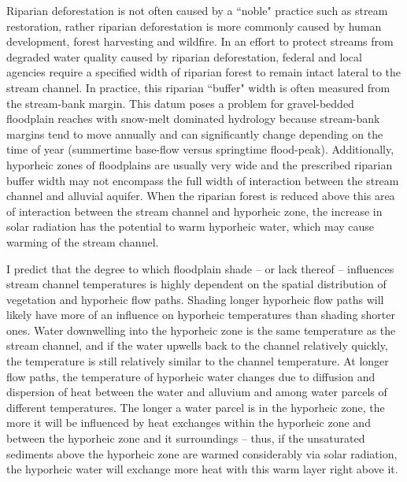 \documentclass[a4paper]{article}
\begin{document}
Riparian deforestation is not often caused by a ``noble" practice such as stream restoration, rather riparian deforestation is more commonly caused by human development, forest harvesting and wildfire. In an effort to protect streams from degraded water quality caused by riparian deforestation, federal and local agencies require a specified width of riparian forest to remain intact lateral to the stream channel. In practice, this riparian ``buffer" width is often measured from the stream-bank margin. This datum poses a problem for gravel-bedded floodplain reaches with snow-melt dominated hydrology because stream-bank margins tend to move annually and can significantly change depending on the time of year (summertime base-flow versus springtime flood-peak). Additionally, hyporheic zones of floodplains are usually very wide and the prescribed riparian buffer width may not encompass the full width of interaction between the stream channel and alluvial aquifer. When the riparian forest is reduced above this area of interaction between the stream channel and hyporheic zone, the increase in solar radiation has the potential to warm hyporheic water, which may cause warming of the stream channel. 

I predict that the degree to which floodplain shade -- or lack thereof -- influences stream channel temperatures is highly dependent on the spatial distribution of vegetation and hyporheic flow paths. Shading longer hyporheic flow paths will likely have more of an influence on hyporheic temperatures than shading shorter ones. Water downwelling into the hyporheic zone is the same temperature as the stream channel, and if the water upwells back to the channel relatively quickly, the temperature is still relatively similar to the channel temperature. At longer flow paths, the temperature of hyporheic water changes due to diffusion and dispersion of heat between the water and alluvium and among water parcels of different temperatures. The longer a water parcel is in the hyporheic zone, the more it will be influenced by heat exchanges within the hyporheic zone and between the hyporheic zone and it surroundings -- thus, if the unsaturated sediments above the hyporheic zone are warmed considerably via solar radiation, the hyporheic water will exchange more heat with this warm layer right above it. 
\end{document}
